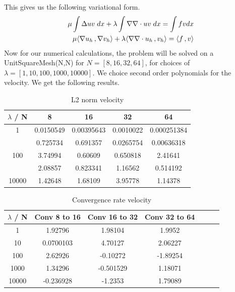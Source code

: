 \documentclass[a4paper,norsk]{article}
\begin{document}
This gives us the following variational form.
\begin{align*}
\mu \int \Delta u v \hspace{1mm} dx + \lambda \int \nabla \nabla \cdot u v \hspace{1mm} dx = \int f v dx\\ 
\mu \langle \nabla u_h \,, \nabla v_h \rangle + \lambda \langle \nabla \nabla \cdot u_h \,, v_h \rangle 
= \langle f \,, v \rangle
\end{align*}
Now for our numerical calculations, the problem will be solved on a UnitSquareMesh(N,N) for $N = [8, 16, 32, 64]$, for 
choices of $\lambda = [1, 10, 100, 1000, 10000]$. We choice second order polynomials for the velocity. We get the following
results.
\begin{table}[ht]
\caption {L2 norm velocity} 
\centering
\begin{tabular}{c|cccc}
\hline
\rowcolor{LightCyan}
$\lambda$ / N  & 8 & 16 & 32 & 64\\
\hline
1     & 0.0150549 & 0.00395643 & 0.0010022 & 0.000251384 \\ \hline
\rowcolor{LightCyan} \hline
10    & 0.725734  & 0.691357   & 0.0265754 & 0.00636318  \\ \hline
100   & 3.74994   & 0.60609    & 0.650818  & 2.41641     \\ \hline
\rowcolor{LightCyan} \hline
1000  & 2.08857   & 0.823341   & 1.16562   & 0.514192    \\ \hline
10000 & 1.42648   & 1.68109    & 3.95778   & 1.14378   \\
\hline
\end{tabular}
\end{table}
\begin{table}[ht]
\caption {Convergence rate velocity} 
\centering
\begin{tabular}{c|cccccc}
\hline
\rowcolor{LightCyan}
$\lambda$ / N  & Conv 8 to 16  &  Conv 16 to 32 &  Conv 32 to 64\\
\hline
1     & 1.92796   & 1.98104   & 1.9952   &  \\ \hline
10    & 0.0700103 & 4.70127   & 2.06227  &  \\ \hline
100   & 2.62926   & -0.10272  & -1.89254 &  \\ \hline
1000  & 1.34296   & -0.501529 & 1.18071  &  \\ \hline
10000 & -0.236928 & -1.2353   & 1.79089  & \\ \hline
\end{tabular}
\end{table}
\end{document}
